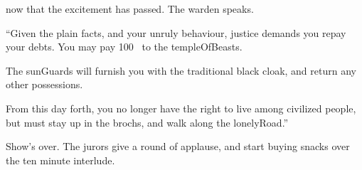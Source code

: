 now that the excitement has passed.
The \gls{warden} speaks.

\begin{speechtext}
  ``Given the plain facts, and your unruly behaviour, justice demands you repay your debts.
  You may pay 100~ to the \gls{templeOfBeasts}.

  The \glspl{sunGuard} will furnish you with the traditional black cloak, and return any other possessions.

  From this day forth, you no longer have the right to live among civilized people, but must stay up in the \glspl{broch}, and walk along the \gls{lonelyRoad}.''
\end{speechtext}

Show's over.
The jurors give a round of applause, and start buying snacks over the ten minute interlude.

